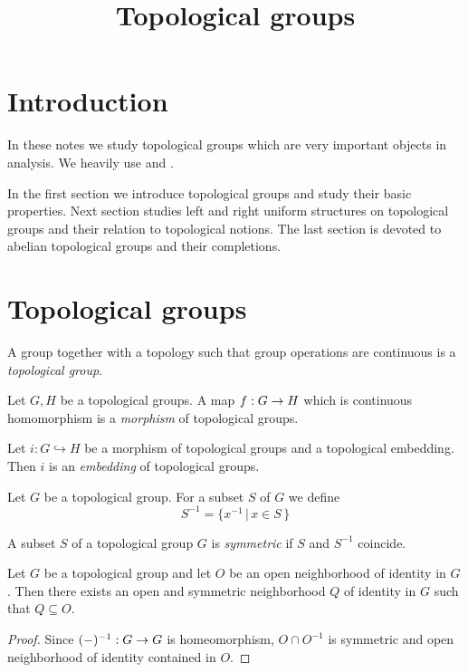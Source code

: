 \documentclass[10pt]{amsart}
\begin{document}
\title{Topological groups}
\date{}
\maketitle

\section{Introduction}
\noindent
In these notes we study topological groups which are very important objects in analysis. We heavily use \cite{Topological_Spaces} and \cite{Uniform_Spaces}.

In the first section we introduce topological groups and study their basic properties. Next section studies left and right uniform structures on topological groups and their relation to topological notions. The last section is devoted to abelian topological groups and their completions.

\section{Topological groups}

\begin{definition}
	A group together with a topology such that group operations are continuous is a \textit{topological group}.
\end{definition}

\begin{definition}
	Let $G,H$ be a topological groups. A map $f:G\rightarrow H$ which is continuous homomorphism is a \textit{morphism} of topological groups.
\end{definition}

\begin{definition}
	Let $i:G\hookrightarrow H$ be a morphism of topological groups and a topological embedding. Then $i$ is an \textit{embedding} of topological groups.
\end{definition}
\noindent
Let $G$ be a topological group. For a subset $S$ of $G$ we define
$$S^{-1} = \big\{x^{-1}\,\big|\,x\in S\,\big\}$$

\begin{definition}
	A subset $S$ of a topological group $G$ is \textit{symmetric} if $S$ and $S^{-1}$ coincide.
\end{definition}

\begin{fact}\label{fact:symmetric_neighborhoods_of_unit_generate_base}
	Let $G$ be a topological group and let $O$ be an open neighborhood of identity in $G$. Then there exists an open and symmetric neighborhood $Q$ of identity in $G$ such that $Q\subseteq O$.
\end{fact}
\begin{proof}
	Since $(-)^{-1}:G\rightarrow G$ is homeomorphism, $O \cap O^{-1}$ is symmetric and open neighborhood of identity contained in $O$.
\end{proof}
\end{document}
